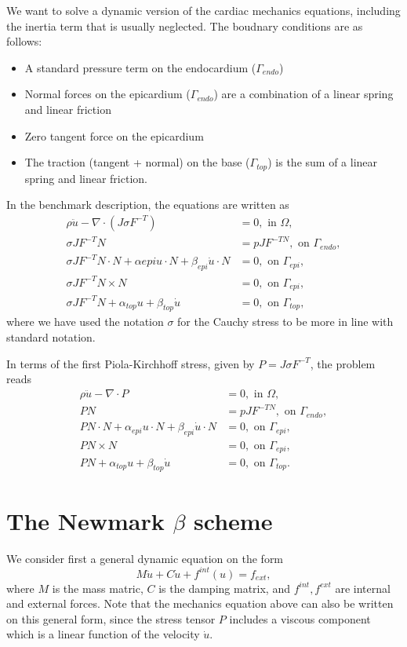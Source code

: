 \documentclass[a4paper,10pt]{article}
\begin{document}
We want to solve a dynamic version of the cardiac mechanics equations, including the
inertia term that is usually neglected. The boudnary conditions are as follows:
\begin{itemize}
\item A standard pressure term on the endocardium ($\Gamma_{endo}$)
\item Normal forces on the epicardium ($\Gamma_{endo}$) are a combination of a linear spring
and linear friction
\item Zero tangent force on the epicardium
\item The traction (tangent + normal) on the base ($\Gamma_{top}$) is the sum of
a linear spring and linear friction.
\end{itemize}
In the benchmark description, the equations are written as
\begin{align*}
  \rho \ddot{u} - \nabla\cdot(J\sigma F^{-T}) &= 0, \mbox{ in } \Omega ,\\
  \sigma J F^{-T}N &= pJF^{-TN}, \mbox{ on } \Gamma_{endo}, \\
  \sigma JF^{-T}N\cdot N + \alpha{epi}u\cdot N + \beta_{epi}\dot{u}\cdot N &= 0, \mbox{ on }  \Gamma_{epi}, \\
  \sigma JF^{-T}N\times N &=0, \mbox{ on }  \Gamma_{epi}, \\
  \sigma JF^{-T}N + \alpha_{top}u + \beta_{top}\dot{u} &= 0, \mbox{ on } \Gamma_{top},
\end{align*}
where we have used the notation $\sigma$ for the Cauchy stress to be more in line with standard notation.

In terms of the first Piola-Kirchhoff stress, given by $P = J\sigma F^{-T}$, the problem reads
\begin{align*}
  \rho \ddot{u} - \nabla\cdot P &= 0, \mbox{ in } \Omega ,\\
  PN &= pJF^{-TN}, \mbox{ on } \Gamma_{endo}, \\
  PN\cdot N + \alpha_{epi}u\cdot N + \beta_{epi}\dot{u}\cdot N &= 0, \mbox{ on }  \Gamma_{epi}, \\
  PN\times N &=0, \mbox{ on }  \Gamma_{epi}, \\
  PN + \alpha_{top}u + \beta_{top}\dot{u} &= 0, \mbox{ on } \Gamma_{top}.
\end{align*}

\appendix
\section{The Newmark $\beta$ scheme}
We consider first a general dynamic equation on the form
\[
M\ddot{u} + C\dot{u} + f^{int}(u) = f_{ext},
\]
where $M$ is the mass matric, $C$ is the damping matrix, and $f^{int}, f^{ext}$
are internal and external forces. Note that the mechanics equation above can also
be written on this general form, since the stress tensor $P$ includes a viscous
component which is a linear function of the velocity $\dot{u}$.
\end{document}
